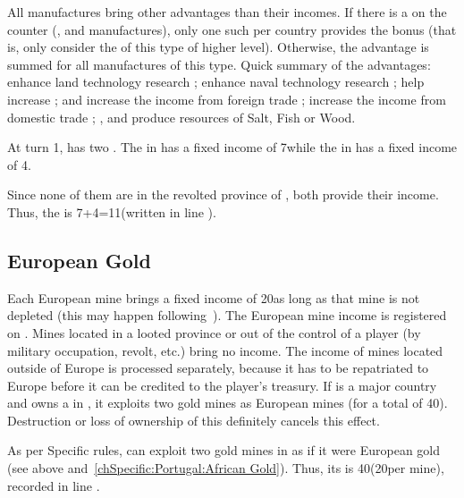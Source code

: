\aparag All manufactures bring other advantages than their incomes.
\bparag If there is a \textetoile on the counter (,
 and  manufactures), only one such \MNU per
country provides the bonus (that is, only consider the \MNU of this type
of higher level).
\bparag Otherwise, the advantage is summed for all manufactures of this
type.
\bparag Quick summary of the advantages:  \MNU enhance land
technology research ;  \MNU enhance naval technology
research ;  \MNU help increase \STAB ;  and 
\MNU increase the income from foreign trade ;  \MNU increase
the income from domestic trade ; ,  and 
\MNU produce resources of Salt, Fish or Wood.

\begin{exemple}
  At turn 1, \POR has two \MNU. The  \MNU in
  \provinceTejo has a fixed income of 7\ducats while the  \MNU
  in  has a fixed income of 4\ducats.

  Since none of them are in the revolted province of \provinceBeira,
  both provide their income. Thus, the  is
  7+4=11\ducats (written in line ).
\end{exemple}

\subsection{European Gold}
\aparag Each European mine brings a fixed income of 20\ducats as long as
that mine is not depleted (this may happen following~). The European mine income is registered on
.
\bparag Mines located in a looted province or out of the control of a
player (by military occupation, revolt, etc.) bring no income.
\aparag The income of mines located outside of Europe is processed
separately, because it has to be repatriated to Europe before it can be
credited to the player's treasury.
 If \POR is a major country and owns a \TP in
, it exploits two gold mines as European mines
(for a total of 40\ducats). Destruction or loss of ownership of this \TP
definitely cancels this effect.

\begin{exemple}
  As per Specific rules, \POR can exploit two gold mines in
   as if it were European gold (see above
  and~\ref{chSpecific:Portugal:African Gold}). Thus, its  is 40\ducats (20\ducats per mine), recorded in line
  .
\end{exemple}

